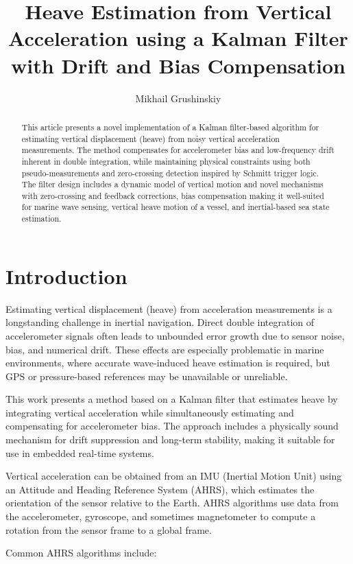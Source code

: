 \documentclass[11pt,letterpaper]{article}
\title{Heave Estimation from Vertical Acceleration using a Kalman Filter with Drift and Bias Compensation}
\author{Mikhail Grushinskiy}
\affil{Independent Researcher, 2025}
\begin{document}
\maketitle

\begin{abstract}
This article presents a novel implementation of a Kalman filter-based algorithm for estimating vertical displacement (heave) from noisy vertical acceleration measurements. The method compensates for accelerometer bias and low-frequency drift inherent in double integration, while maintaining physical constraints using both pseudo-measurements and zero-crossing detection inspired by Schmitt trigger logic. The filter design includes a dynamic model of vertical motion and novel mechanisms with zero-crossing and feedback corrections, bias compensation making it well-suited for marine wave sensing, vertical heave motion of a vessel, and inertial-based sea state estimation.
\end{abstract}

\section{Introduction}

Estimating vertical displacement (heave) from acceleration measurements is a longstanding challenge in inertial navigation. Direct double integration of accelerometer signals often leads to unbounded error growth due to sensor noise, bias, and numerical drift. These effects are especially problematic in marine environments, where accurate wave-induced heave estimation is required, but GPS or pressure-based references may be unavailable or unreliable.

This work presents a method based on a Kalman filter that estimates heave by integrating vertical acceleration while simultaneously estimating and compensating for accelerometer bias. The approach includes a physically sound mechanism for drift suppression and long-term stability, making it suitable for use in embedded real-time systems.

Vertical acceleration can be obtained from an IMU (Inertial Motion Unit) using an Attitude and Heading Reference System (AHRS), which estimates the orientation of the sensor relative to the Earth. AHRS algorithms use data from the accelerometer, gyroscope, and sometimes magnetometer to compute a rotation from the sensor frame to a global frame. 

Common AHRS algorithms include:
\end{document}
